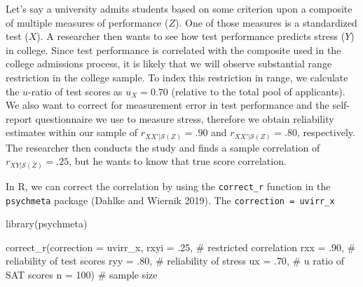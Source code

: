 \documentclass[
  letterpaper,
  DIV=11,
  numbers=noendperiod]{scrreprt}
\newenvironment{Shaded}{}{}
\newcommand{\AttributeTok}[1]{\textcolor[rgb]{0.00,0.34,0.68}{#1}}
\newcommand{\CommentTok}[1]{\textcolor[rgb]{0.54,0.53,0.53}{#1}}
\newcommand{\DecValTok}[1]{\textcolor[rgb]{0.69,0.50,0.00}{#1}}
\newcommand{\FunctionTok}[1]{\textcolor[rgb]{0.39,0.29,0.61}{#1}}
\newcommand{\NormalTok}[1]{\textcolor[rgb]{0.12,0.11,0.11}{#1}}
\newcommand{\StringTok}[1]{\textcolor[rgb]{0.75,0.01,0.01}{#1}}
\begin{document}
\begin{tcolorbox}[enhanced jigsaw, opacityback=0, coltitle=black, toprule=.15mm, colframe=quarto-callout-note-color-frame, bottomtitle=1mm, rightrule=.15mm, colbacktitle=quarto-callout-note-color!10!white, left=2mm, bottomrule=.15mm, breakable, title={Applied Example in R}, colback=white, opacitybacktitle=0.6, titlerule=0mm, arc=.35mm, leftrule=.75mm, toptitle=1mm]

Let's say a university admits students based on some criterion upon a
composite of multiple measures of performance (\(Z\)). One of those
measures is a standardized test (\(X\)). A researcher then wants to see
how test performance predicts stress (\(Y\)) in college. Since test
performance is correlated with the composite used in the college
admissions process, it is likely that we will observe substantial range
restriction in the college sample. To index this restriction in range,
we calculate the \(u\)-ratio of test scores as \(u_{X}=0.70\) (relative
to the total pool of applicants). We also want to correct for
measurement error in test performance and the self-report questionnaire
we use to measure stress, therefore we obtain reliability estimates
within our sample of \(r_{XX'|\mathcal{S}(Z)}=.90\) and
\(r_{XX'|\mathcal{S}(Z)}=.80\), respectively. The researcher then
conducts the study and finds a sample correlation of
\(r_{XY|\mathcal{S}(Z)}=.25\), but he wants to know that true score
correlation.

In R, we can correct the correlation by using the \texttt{correct\_r}
function in the \texttt{psychmeta} package (Dahlke and Wiernik 2019).
The \texttt{correction\ =\ \textquotesingle{}uvirr\_x\textquotesingle{}}

\begin{Shaded}
\begin{Highlighting}[]
\FunctionTok{library}\NormalTok{(psychmeta)}

\FunctionTok{correct\_r}\NormalTok{(}\AttributeTok{correction =} \StringTok{\textquotesingle{}uvirr\_x\textquotesingle{}}\NormalTok{,}
          \AttributeTok{rxyi =}\NormalTok{ .}\DecValTok{25}\NormalTok{,  }\CommentTok{\# restricted correlation}
          \AttributeTok{rxx =}\NormalTok{ .}\DecValTok{90}\NormalTok{,  }\CommentTok{\# reliability of test scores}
          \AttributeTok{ryy =}\NormalTok{ .}\DecValTok{80}\NormalTok{,  }\CommentTok{\# reliability of stress}
          \AttributeTok{ux =}\NormalTok{ .}\DecValTok{70}\NormalTok{,   }\CommentTok{\# u ratio of SAT scores}
          \AttributeTok{n =} \DecValTok{100}\NormalTok{)    }\CommentTok{\# sample size}
\end{Highlighting}
\end{Shaded}


\end{tcolorbox}
\end{document}
